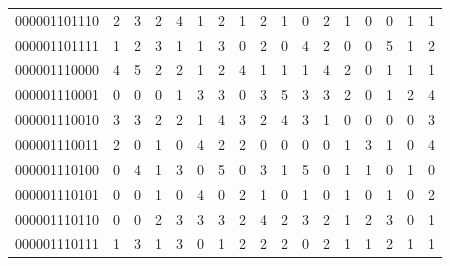 \documentclass[10pt,a4paper]{article}
\begin{document}
\begin{longtable}{ |c|c|c|c|c|c|c|c|c|c|c|c|c|c|c|c|c| }
    000001101110              & 2                            & 3                                & 2                            & 4                              & 1   & 2   & 1   & 2   & 1   & 0   & 2   & 1   & 0   & 0   & 1   & 1   \\
    000001101111              & 1                            & 2                                & 3                            & 1                              & 1   & 3   & 0   & 2   & 0   & 4   & 2   & 0   & 0   & 5   & 1   & 2   \\
    000001110000              & 4                            & 5                                & 2                            & 2                              & 1   & 2   & 4   & 1   & 1   & 1   & 4   & 2   & 0   & 1   & 1   & 1   \\
    000001110001              & 0                            & 0                                & 0                            & 1                              & 3   & 3   & 0   & 3   & 5   & 3   & 3   & 2   & 0   & 1   & 2   & 4   \\
    000001110010              & 3                            & 3                                & 2                            & 2                              & 1   & 4   & 3   & 2   & 4   & 3   & 1   & 0   & 0   & 0   & 0   & 3   \\
    000001110011              & 2                            & 0                                & 1                            & 0                              & 4   & 2   & 2   & 0   & 0   & 0   & 0   & 1   & 3   & 1   & 0   & 4   \\
    000001110100              & 0                            & 4                                & 1                            & 3                              & 0   & 5   & 0   & 3   & 1   & 5   & 0   & 1   & 1   & 0   & 1   & 0   \\
    000001110101              & 0                            & 0                                & 1                            & 0                              & 4   & 0   & 2   & 1   & 0   & 1   & 0   & 1   & 0   & 1   & 0   & 2   \\
    000001110110              & 0                            & 0                                & 2                            & 3                              & 3   & 3   & 2   & 4   & 2   & 3   & 2   & 1   & 2   & 3   & 0   & 1   \\
    000001110111              & 1                            & 3                                & 1                            & 3                              & 0   & 1   & 2   & 2   & 2   & 0   & 2   & 1   & 1   & 2   & 1   & 1   \\

\end{longtable}
\end{document}
